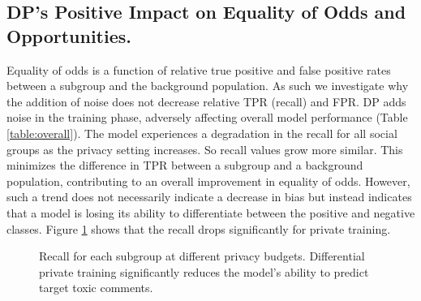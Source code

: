\documentclass[11pt]{article} %
\begin{document}
\subsection{DP's Positive Impact on Equality of Odds and Opportunities.}

Equality of odds is a function of relative true positive and false positive rates between a subgroup and the background population. As such we investigate why the addition of noise does not decrease relative TPR (recall) and FPR. DP adds noise in the training phase, adversely affecting overall model performance (Table \ref{table:overall}). The model experiences a degradation in the recall for all social groups as the privacy setting increases. So recall values grow more similar. This minimizes the difference in TPR between a subgroup and a background population, contributing to an overall improvement in equality of odds. However, such a trend does not necessarily indicate a decrease in bias but instead indicates that a model is losing its ability to differentiate between the positive and negative classes.  Figure \ref{figure:recall} shows that the recall drops significantly for private training.

\begin{figure}[htbp]
    \centering

    \caption{Recall for each subgroup at different privacy budgets. Differential private training significantly reduces the model's ability to predict target toxic comments.  }
    \label{figure:recall}
\end{figure}
\end{document}
